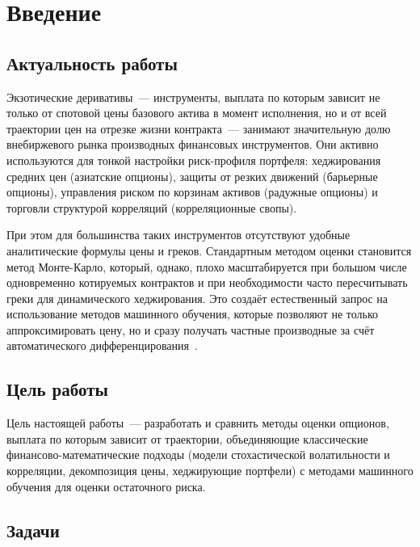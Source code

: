 \chapter*{Введение}

\section*{Актуальность работы}

Экзотические деривативы~--- инструменты, выплата по которым зависит не
только от спотовой цены базового актива в момент исполнения, но и от
всей траектории цен на отрезке жизни контракта~--- занимают значительную
долю внебиржевого рынка производных финансовых инструментов. Они активно
используются для тонкой настройки риск-профиля портфеля: хеджирования
средних цен (азиатские опционы), защиты от резких движений
(барьерные опционы), управления риском по корзинам активов (радужные
опционы) и торговли структурой корреляций (корреляционные свопы).

При этом для большинства таких инструментов отсутствуют удобные
аналитические формулы цены и греков. Стандартным методом оценки
становится метод Монте-Карло, который, однако, плохо масштабируется при
большом числе одновременно котируемых контрактов и при необходимости
часто пересчитывать греки для динамического хеджирования. Это создаёт
естественный запрос на использование методов машинного обучения, которые
позволяют не только аппроксимировать цену, но и сразу получать частные
производные за счёт автоматического дифференцирования~\cite{joas2024}.

\section*{Цель работы}

Цель настоящей работы~--- разработать и сравнить методы оценки опционов,
выплата по которым зависит от траектории, объединяющие классические
финансово-математические подходы (модели стохастической волатильности и
корреляции, декомпозиция цены, хеджирующие портфели) с методами
машинного обучения для оценки оста\-точного риска.

\section*{Задачи}


